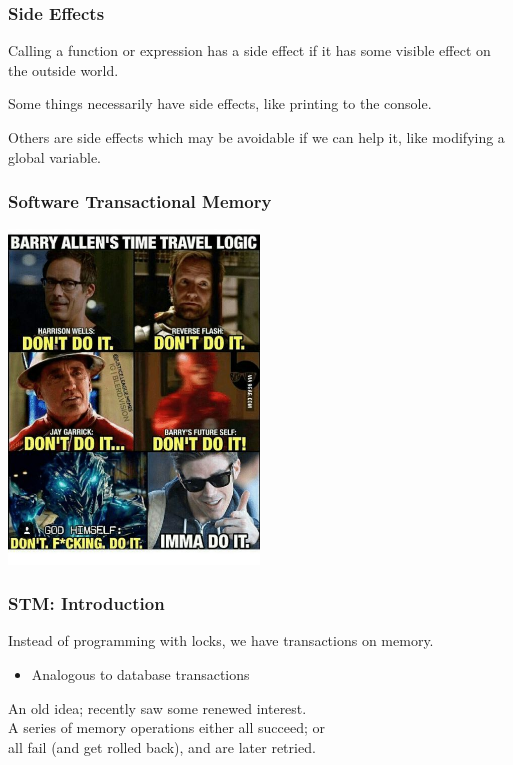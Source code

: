 \begin{frame}
\frametitle{Side Effects}

Calling a function or expression has a side effect if it has some visible effect on the outside world. 

Some things necessarily have side effects, like printing to the console. 

Others are side effects which may be avoidable if we can help it, like modifying a global variable.

\end{frame}




\begin{frame}
\frametitle{Software Transactional Memory}

\begin{center}
	\includegraphics[width=0.5\textwidth]{images/timetravel.jpg}
\end{center}


\end{frame}


\begin{frame}
  \frametitle{STM: Introduction}


    Instead of programming with locks, we have transactions on memory.
      \begin{itemize}
        \item Analogous to database transactions
      \end{itemize}
    An old idea; recently saw some renewed interest.\\[1em]

    A series of memory operations either all succeed; or \\ \qquad
     all fail (and get
      rolled back), and are later retried.

\end{frame}

